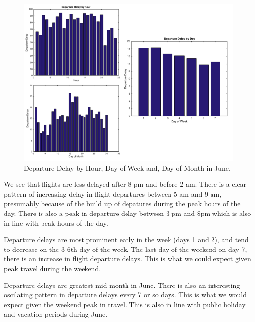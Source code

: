 \documentclass[a4paper, 10pt]{article}
\begin{document}
\begin{figure}[H]
\begin{center}
\includegraphics[scale=0.5]{explore}
\caption{Departure Delay by Hour, Day of Week and, Day of Month in June.}
\label{explore}
\end{center}
\end{figure}

We see that flights are less delayed after 8 pm and before 2 am. There is a clear pattern of increasing delay in flight departures between 5 am and 9 am, presumably because of the build up of depatures during the peak hours of the day. There is also a peak in departure delay between 3 pm and 8pm which is also in line with peak hours of the day.

\vspace{5mm}
Departure delays are most prominent early in the week (days 1 and 2), and tend to decrease on the 3-6th day of the week. The last day of the weekend on day 7, there is an increase in flight departure delays. This is what we could expect given peak travel during the weekend.

\vspace{5mm}
Departure delays are greatest mid month in June. There is also an interesting oscilating pattern in departure delays every 7 or so days. This is what we would expect given the weekend peak in travel. This is also in line with public holiday and vacation periods during June.
\end{document}
